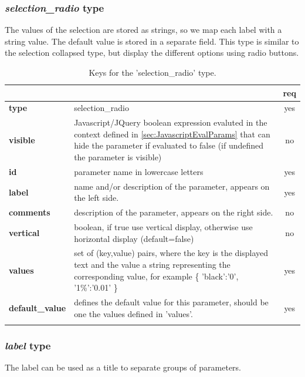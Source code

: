 \subsubsection{ \emph{selection\_radio} type}

The values of the selection are stored as strings, so we map each label with a 
string value. The default value is stored in a separate field.
This type is similar to the selection collapsed type, but display the different
options using radio buttons.

\begin{longtable}{|>{\bf}L{\linewidth}|L{\linewidth}|c|}
\hline
      &  & {\bf req} 
\tabularnewline \hline \hline
 type     & selection\_radio    & yes \\ \hline
 visible  & Javascript/JQuery boolean expression evaluted in the context defined 
              in \ref{sec:JavascriptEvalParams} that can hide the parameter if
            evaluated to false (if undefined the parameter is visible)& no \\ \hline
 id       & parameter name in lowercase letters & yes \\ \hline
 label  & name and/or description of the parameter, appears on the left side. & yes
                      \\ \hline
 comments & description of the parameter, appears on the right side. & no
                      \\ \hline
 vertical & boolean, if true use vertical display, otherwise use horizontal
            display (default=false) & no \\ \hline
 values   & set of (key,value) pairs, where the key is the displayed text and the 
value a string representing the corresponding value, for example \{ 
'black':'0', '1\%':'0.01' \} & yes
                      \\ \hline
 default\_value & defines the default value for this parameter, should be one 
the values defined in 'values'. & yes \\ \hline
\caption{Keys for the 'selection\_radio' type.}
\end{longtable}

\subsubsection{ \emph{label} type}

The label  can be used as a title to separate groups of parameters.

